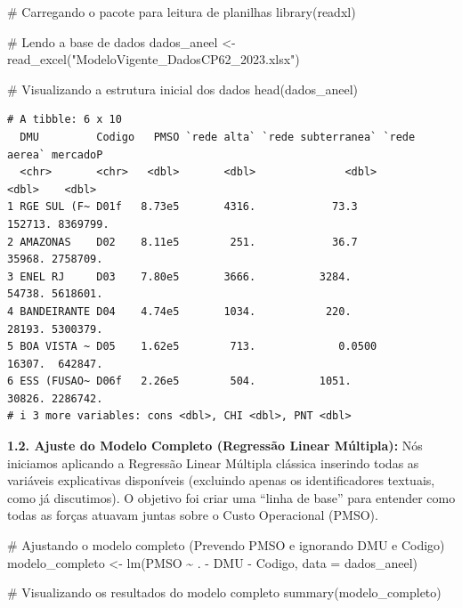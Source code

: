 \documentclass[
  letterpaper,
]{article}
\newenvironment{Shaded}{\begin{snugshade}}{\end{snugshade}}
\newcommand{\AttributeTok}[1]{\textcolor[rgb]{0.40,0.45,0.13}{#1}}
\newcommand{\CommentTok}[1]{\textcolor[rgb]{0.37,0.37,0.37}{#1}}
\newcommand{\FunctionTok}[1]{\textcolor[rgb]{0.28,0.35,0.67}{#1}}
\newcommand{\NormalTok}[1]{\textcolor[rgb]{0.00,0.23,0.31}{#1}}
\newcommand{\OtherTok}[1]{\textcolor[rgb]{0.00,0.23,0.31}{#1}}
\newcommand{\SpecialCharTok}[1]{\textcolor[rgb]{0.37,0.37,0.37}{#1}}
\newcommand{\StringTok}[1]{\textcolor[rgb]{0.13,0.47,0.30}{#1}}
\begin{document}
\begin{Shaded}
\begin{Highlighting}[]
\CommentTok{\# Carregando o pacote para leitura de planilhas}
\FunctionTok{library}\NormalTok{(readxl)}

\CommentTok{\# Lendo a base de dados}
\NormalTok{dados\_aneel }\OtherTok{\textless{}{-}} \FunctionTok{read\_excel}\NormalTok{(}\StringTok{"ModeloVigente\_DadosCP62\_2023.xlsx"}\NormalTok{)}

\CommentTok{\# Visualizando a estrutura inicial dos dados}
\FunctionTok{head}\NormalTok{(dados\_aneel)}
\end{Highlighting}
\end{Shaded}

\begin{verbatim}
# A tibble: 6 x 10
  DMU         Codigo   PMSO `rede alta` `rede subterranea` `rede aerea` mercadoP
  <chr>       <chr>   <dbl>       <dbl>              <dbl>        <dbl>    <dbl>
1 RGE SUL (F~ D01f   8.73e5       4316.            73.3         152713. 8369799.
2 AMAZONAS    D02    8.11e5        251.            36.7          35968. 2758709.
3 ENEL RJ     D03    7.80e5       3666.          3284.           54738. 5618601.
4 BANDEIRANTE D04    4.74e5       1034.           220.           28193. 5300379.
5 BOA VISTA ~ D05    1.62e5        713.             0.0500       16307.  642847.
6 ESS (FUSAO~ D06f   2.26e5        504.          1051.           30826. 2286742.
# i 3 more variables: cons <dbl>, CHI <dbl>, PNT <dbl>
\end{verbatim}

\textbf{1.2. Ajuste do Modelo Completo (Regressão Linear Múltipla):} Nós
iniciamos aplicando a Regressão Linear Múltipla clássica inserindo todas
as variáveis explicativas disponíveis (excluindo apenas os
identificadores textuais, como já discutimos). O objetivo foi criar uma
``linha de base'' para entender como todas as forças atuavam juntas
sobre o Custo Operacional (PMSO).

\begin{Shaded}
\begin{Highlighting}[]
\CommentTok{\# Ajustando o modelo completo (Prevendo PMSO e ignorando DMU e Codigo)}
\NormalTok{modelo\_completo }\OtherTok{\textless{}{-}} \FunctionTok{lm}\NormalTok{(PMSO }\SpecialCharTok{\textasciitilde{}}\NormalTok{ . }\SpecialCharTok{{-}}\NormalTok{ DMU }\SpecialCharTok{{-}}\NormalTok{ Codigo, }\AttributeTok{data =}\NormalTok{ dados\_aneel)}

\CommentTok{\# Visualizando os resultados do modelo completo}
\FunctionTok{summary}\NormalTok{(modelo\_completo)}
\end{Highlighting}
\end{Shaded}
\end{document}
